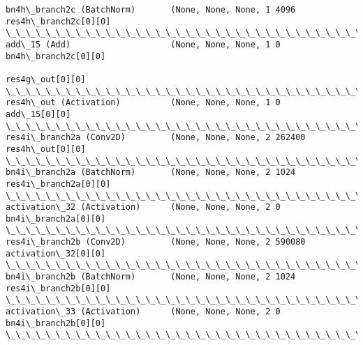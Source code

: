 \documentclass[11pt]{article}
\begin{document}
\begin{Verbatim}[commandchars=\\\{\}]
bn4h\_branch2c (BatchNorm)       (None, None, None, 1 4096        res4h\_branch2c[0][0]             
\_\_\_\_\_\_\_\_\_\_\_\_\_\_\_\_\_\_\_\_\_\_\_\_\_\_\_\_\_\_\_\_\_\_\_\_\_\_\_\_\_\_\_\_\_\_\_\_\_\_\_\_\_\_\_\_\_\_\_\_\_\_\_\_\_\_\_\_\_\_\_\_\_\_\_\_\_\_\_\_\_\_\_\_\_\_\_\_\_\_\_\_\_\_\_\_\_\_
add\_15 (Add)                    (None, None, None, 1 0           bn4h\_branch2c[0][0]              
                                                                 res4g\_out[0][0]                  
\_\_\_\_\_\_\_\_\_\_\_\_\_\_\_\_\_\_\_\_\_\_\_\_\_\_\_\_\_\_\_\_\_\_\_\_\_\_\_\_\_\_\_\_\_\_\_\_\_\_\_\_\_\_\_\_\_\_\_\_\_\_\_\_\_\_\_\_\_\_\_\_\_\_\_\_\_\_\_\_\_\_\_\_\_\_\_\_\_\_\_\_\_\_\_\_\_\_
res4h\_out (Activation)          (None, None, None, 1 0           add\_15[0][0]                     
\_\_\_\_\_\_\_\_\_\_\_\_\_\_\_\_\_\_\_\_\_\_\_\_\_\_\_\_\_\_\_\_\_\_\_\_\_\_\_\_\_\_\_\_\_\_\_\_\_\_\_\_\_\_\_\_\_\_\_\_\_\_\_\_\_\_\_\_\_\_\_\_\_\_\_\_\_\_\_\_\_\_\_\_\_\_\_\_\_\_\_\_\_\_\_\_\_\_
res4i\_branch2a (Conv2D)         (None, None, None, 2 262400      res4h\_out[0][0]                  
\_\_\_\_\_\_\_\_\_\_\_\_\_\_\_\_\_\_\_\_\_\_\_\_\_\_\_\_\_\_\_\_\_\_\_\_\_\_\_\_\_\_\_\_\_\_\_\_\_\_\_\_\_\_\_\_\_\_\_\_\_\_\_\_\_\_\_\_\_\_\_\_\_\_\_\_\_\_\_\_\_\_\_\_\_\_\_\_\_\_\_\_\_\_\_\_\_\_
bn4i\_branch2a (BatchNorm)       (None, None, None, 2 1024        res4i\_branch2a[0][0]             
\_\_\_\_\_\_\_\_\_\_\_\_\_\_\_\_\_\_\_\_\_\_\_\_\_\_\_\_\_\_\_\_\_\_\_\_\_\_\_\_\_\_\_\_\_\_\_\_\_\_\_\_\_\_\_\_\_\_\_\_\_\_\_\_\_\_\_\_\_\_\_\_\_\_\_\_\_\_\_\_\_\_\_\_\_\_\_\_\_\_\_\_\_\_\_\_\_\_
activation\_32 (Activation)      (None, None, None, 2 0           bn4i\_branch2a[0][0]              
\_\_\_\_\_\_\_\_\_\_\_\_\_\_\_\_\_\_\_\_\_\_\_\_\_\_\_\_\_\_\_\_\_\_\_\_\_\_\_\_\_\_\_\_\_\_\_\_\_\_\_\_\_\_\_\_\_\_\_\_\_\_\_\_\_\_\_\_\_\_\_\_\_\_\_\_\_\_\_\_\_\_\_\_\_\_\_\_\_\_\_\_\_\_\_\_\_\_
res4i\_branch2b (Conv2D)         (None, None, None, 2 590080      activation\_32[0][0]              
\_\_\_\_\_\_\_\_\_\_\_\_\_\_\_\_\_\_\_\_\_\_\_\_\_\_\_\_\_\_\_\_\_\_\_\_\_\_\_\_\_\_\_\_\_\_\_\_\_\_\_\_\_\_\_\_\_\_\_\_\_\_\_\_\_\_\_\_\_\_\_\_\_\_\_\_\_\_\_\_\_\_\_\_\_\_\_\_\_\_\_\_\_\_\_\_\_\_
bn4i\_branch2b (BatchNorm)       (None, None, None, 2 1024        res4i\_branch2b[0][0]             
\_\_\_\_\_\_\_\_\_\_\_\_\_\_\_\_\_\_\_\_\_\_\_\_\_\_\_\_\_\_\_\_\_\_\_\_\_\_\_\_\_\_\_\_\_\_\_\_\_\_\_\_\_\_\_\_\_\_\_\_\_\_\_\_\_\_\_\_\_\_\_\_\_\_\_\_\_\_\_\_\_\_\_\_\_\_\_\_\_\_\_\_\_\_\_\_\_\_
activation\_33 (Activation)      (None, None, None, 2 0           bn4i\_branch2b[0][0]              
\_\_\_\_\_\_\_\_\_\_\_\_\_\_\_\_\_\_\_\_\_\_\_\_\_\_\_\_\_\_\_\_\_\_\_\_\_\_\_\_\_\_\_\_\_\_\_\_\_\_\_\_\_\_\_\_\_\_\_\_\_\_\_\_\_\_\_\_\_\_\_\_\_\_\_\_\_\_\_\_\_\_\_\_\_\_\_\_\_\_\_\_\_\_\_\_\_\_

\end{Verbatim}
\end{document}
